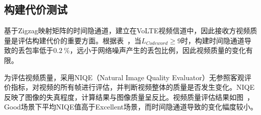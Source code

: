 \subsection{构建代价测试}
\label{chap:zigzag:results:cost}


基于Zigzag映射矩阵的时间隐通道，建立在VoLTE视频信道中，因此接收方视频质量是评估构建代价的重要方面。根据表\ ，当$L_{Codeword}\ge 9$时，构建时间隐通道导致的丢包率低于$0.2\ \%$，远小于网络噪声产生的丢包比例，因此视频质量的变化有限。

为评估视频质量，采用NIQE（Natural Image Quality Evaluator）无参照客观评价指标，对视频的所有帧进行评估，并判断视频整体的质量是否发生变化。NIQE反映了图像的失真程度，计算结果与图像质量呈反比。视频质量评估结果如图\ ，Good场景下平均NIQE值高于Excellent场景，而时间隐通道导致的变化幅度较小。

